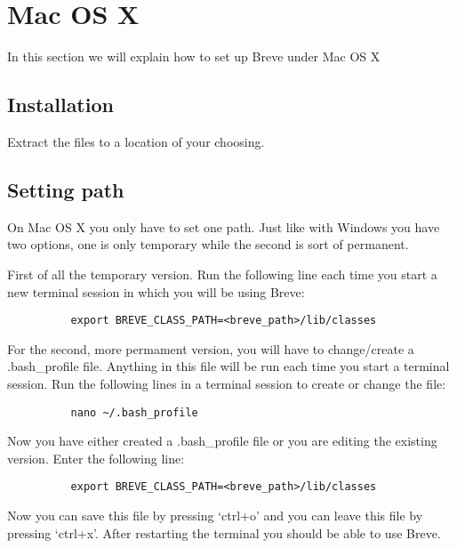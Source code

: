 \section{Mac OS X}
	In this section we will explain how to set up Breve under Mac OS X

\subsection{Installation}
	Extract the files to a location of your choosing.

\subsection{Setting path}
	On Mac OS X you only have to set one path. Just like with Windows you have two options, one is only temporary while the second is sort of permanent. 

	First of all the temporary version. Run the following line each time you start a new terminal session in which you will be using Breve:
	\begin{verbatim}
		  export BREVE_CLASS_PATH=<breve_path>/lib/classes
	\end{verbatim}

	For the second, more permament version, you will have to change/create a .bash\_profile file. Anything in this file will be run each time you start a terminal session. Run the following lines in a terminal session to create or change the file:
	\begin{verbatim}
		  nano ~/.bash_profile
	\end{verbatim}
	Now you have either created a .bash\_profile file or you are editing the existing version. Enter the following line:
	\begin{verbatim}
		  export BREVE_CLASS_PATH=<breve_path>/lib/classes
	\end{verbatim}
	Now you can save this file by pressing `ctrl+o' and you can leave this file by pressing `ctrl+x'. After restarting the terminal you should be able to use Breve. 

